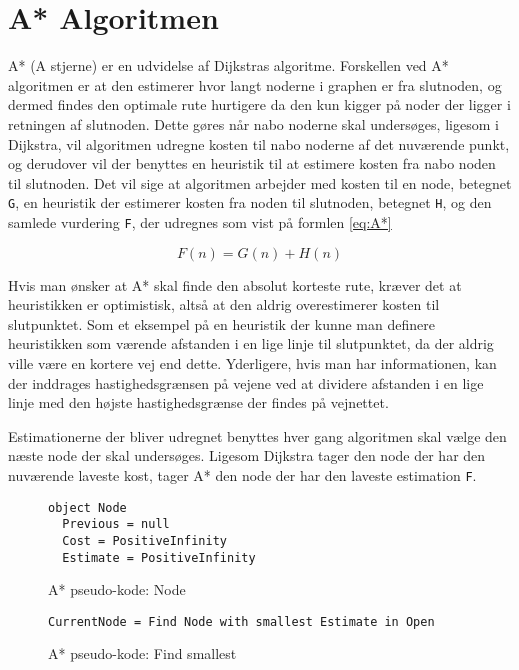 \section{A* Algoritmen}
A* (A stjerne) er en udvidelse af Dijkstras algoritme. Forskellen ved A* algoritmen er at den estimerer hvor langt noderne i graphen er fra slutnoden, og dermed findes den optimale rute hurtigere da den kun kigger på noder der ligger i retningen af slutnoden. Dette gøres når nabo noderne skal undersøges, ligesom i Dijkstra, vil algoritmen udregne kosten til nabo noderne af det nuværende punkt, og derudover vil der benyttes en heuristik til at estimere kosten fra nabo noden til slutnoden. Det vil sige at algoritmen arbejder med kosten til en node, betegnet \texttt{G}, en heuristik der estimerer kosten fra noden til slutnoden, betegnet \texttt{H}, og den samlede vurdering \texttt{F}, der udregnes som vist på formlen \ref{eq:A*}

\begin{equation} \label{eq:A*}
F(n) = G(n) + H(n)
\end{equation}
\vspace{5mm}

Hvis man ønsker at A* skal finde den absolut korteste rute, kræver det at heuristikken er optimistisk, altså at den aldrig overestimerer kosten til slutpunktet. Som et eksempel på en heuristik der kunne man definere heuristikken som værende afstanden i en lige linje til slutpunktet, da der aldrig ville være en kortere vej end dette. Yderligere, hvis man har informationen, kan der inddrages hastighedsgrænsen på vejene ved at dividere afstanden i en lige linje med den højste hastighedsgrænse der findes på vejnettet.

\vspace{5mm}

Estimationerne der bliver udregnet benyttes hver gang algoritmen skal vælge den næste node der skal undersøges. Ligesom Dijkstra tager den node der har den nuværende laveste kost, tager A* den node der har den laveste estimation \texttt{F}.

\begin{figure}[H]
\begin{lstlisting}
object Node
  Previous = null
  Cost = PositiveInfinity
  Estimate = PositiveInfinity
\end{lstlisting}
\caption{A* pseudo-kode: Node}\label{AStarCodeNode}
\end{figure}

\begin{figure}[H]
\begin{lstlisting}
CurrentNode = Find Node with smallest Estimate in Open
\end{lstlisting}
\caption{A* pseudo-kode: Find smallest}\label{AStarCodeFindSmallest}
\end{figure}

